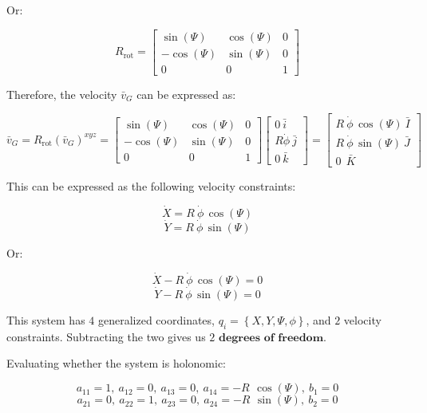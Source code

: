 \documentclass[12pt, letterpaper]{../assignment}
\begin{document}
Or:

$$  R_\text{rot} = 
\left[\begin{array}{ccc} \sin\left(\Psi \right) & \cos\left(\Psi \right) & 0\\ -\cos\left(\Psi \right) & \sin\left(\Psi \right) & 0\\ 0 & 0 & 1 \end{array}\right] $$

Therefore, the velocity $\bar{v}_G$ can be expressed as:

$$ \bar{v}_G = R_\text{rot} \left(\bar{v}_G\right)^{xyz} = 
\left[\begin{array}{ccc} \sin\left(\Psi \right) & \cos\left(\Psi \right) & 0\\ -\cos\left(\Psi \right) & \sin\left(\Psi \right) & 0\\ 0 & 0 & 1 \end{array}\right]
\left[\begin{array}{r} 0 \ \bar{i}\\ R \dot{\phi}\ \bar{j}\\ 0 \ \bar{k} \end{array}\right]
= \left[\begin{array}{r} R\ \dot{\phi} \,\cos\left(\Psi \right)\ \bar{I}\\ R\ \dot{\phi}\,\sin\left(\Psi \right)\ \bar{J}\\ 0\ \ \bar{K} \end{array}\right]$$

This can be expressed as the following velocity constraints:

\begin{answer}
$$ \dot{X} = R\ \dot{\phi} \,\cos\left(\Psi \right) $$
$$ \dot{Y} = R\ \dot{\phi}\,\sin\left(\Psi \right) $$
\end{answer}

Or: 

 $$ \dot{X} -R\ \dot{\phi}\,\cos\left(\Psi \right) = 0 $$
$$ \dot{Y} - R\ \dot{\phi}\,\sin\left(\Psi \right) = 0 $$

\begin{answer}
This system has $4$ generalized coordinates, $q_i = \left\{X, Y, \Psi, \phi\right\}$, and $2$ velocity constraints.
Subtracting the two gives us $2 \textbf{ degrees of freedom}.$
\end{answer}

Evaluating whether the system is holonomic:

$$ a_{11} = 1,\ a_{12} = 0,\ a_{13} = 0,\ a_{14} = -R\ \,\cos\left(\Psi\right), \ b_1 = 0 $$
$$ a_{21} = 0,\ a_{22} = 1,\ a_{23} = 0,\ a_{24} = -R\ \,\sin\left(\Psi\right), \ b_2 = 0 $$
\end{document}
